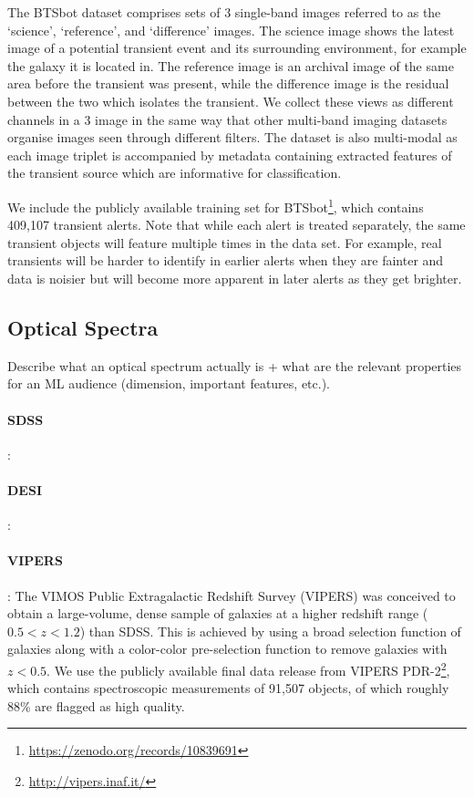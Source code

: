 The BTSbot dataset comprises sets of 3 single-band images referred to as the `science', `reference', and `difference' images. The science image shows the latest image of a potential transient event and its surrounding environment, for example the galaxy it is located in. The reference image is an archival image of the same area before the transient was present, while the difference image is the residual between the two which isolates the transient. We collect these views as different channels in a 3 image in the same way that other multi-band imaging datasets organise images seen through different filters. The dataset is also multi-modal as each image triplet is accompanied by metadata containing extracted features of the transient source which are informative for classification.

 We include the publicly available training set for BTSbot\footnote{\url{https://zenodo.org/records/10839691}}, which contains 409,107 transient alerts. Note that while each alert is treated separately, the same transient objects will feature multiple times in the data set. For example, real transients will be harder to identify in earlier alerts when they are fainter and data is noisier but will become more apparent in later alerts as they get brighter. 

\subsection{Optical Spectra}


Describe what an optical spectrum actually is + what are the relevant properties for an ML audience (dimension, important features, etc.). 

\paragraph{SDSS}: 

\paragraph{DESI}: 

\paragraph{VIPERS}: The VIMOS Public Extragalactic Redshift Survey (VIPERS) \cite{scodeggio2018vimos} was conceived to obtain a large-volume, dense sample of galaxies at a higher redshift range ($0.5 < z < 1.2$) than SDSS. This is achieved by using a broad selection function of galaxies along with a color-color pre-selection function to remove galaxies with $z < 0.5$. We use the publicly available final data release from VIPERS PDR-2\footnote{\url{http://vipers.inaf.it/}}, which contains spectroscopic measurements of 91,507 objects, of which roughly 88\% are flagged as high quality.

